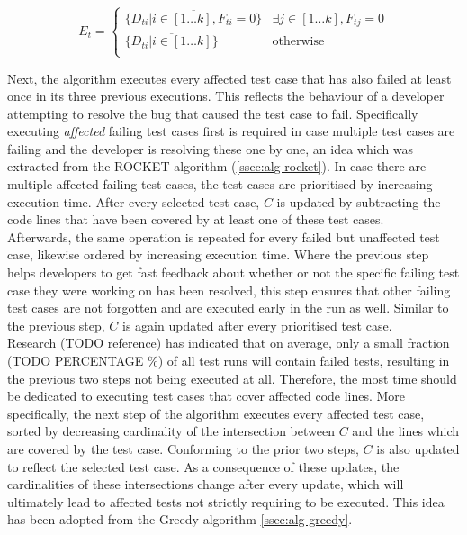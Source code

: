 \[
	E_t = \left.
	\begin{cases}
		\overline{\{D_{ti} \vert i \in [1 \dots k], F_{ti} = 0\}} & \exists j \in [1 \dots k], F_{tj} = 0 \\
		\overline{\{D_{ti} \vert i \in [1 \dots k]\}} & \text{otherwise} \\
	\end{cases}
	\right.
\]

\noindent Next, the algorithm executes every affected test case that has also failed at least once in its three previous executions. This reflects the behaviour of a developer attempting to resolve the bug that caused the test case to fail. Specifically executing \emph{affected} failing test cases first is required in case multiple test cases are failing and the developer is resolving these one by one, an idea which was extracted from the ROCKET algorithm (\autoref{ssec:alg-rocket}). In case there are multiple affected failing test cases, the test cases are prioritised by increasing execution time. After every selected test case, $C$ is updated by subtracting the code lines that have been covered by at least one of these test cases.\\

\noindent Afterwards, the same operation is repeated for every failed but unaffected test case, likewise ordered by increasing execution time. Where the previous step helps developers to get fast feedback about whether or not the specific failing test case they were working on has been resolved, this step ensures that other failing test cases are not forgotten and are executed early in the run as well. Similar to the previous step, $C$ is again updated after every prioritised test case.\\

\noindent Research (TODO reference) has indicated that on average, only a small fraction (TODO PERCENTAGE \%) of all test runs will contain failed tests, resulting in the previous two steps not being executed at all. Therefore, the most time should be dedicated to executing test cases that cover affected code lines. More specifically, the next step of the algorithm executes every affected test case, sorted by decreasing cardinality of the intersection between $C$ and the lines which are covered by the test case. Conforming to the prior two steps, $C$ is also updated to reflect the selected test case. As a consequence of these updates, the cardinalities of these intersections change after every update, which will ultimately lead to affected tests not strictly requiring to be executed. This idea has been adopted from the Greedy algorithm \autoref{ssec:alg-greedy}.\\

